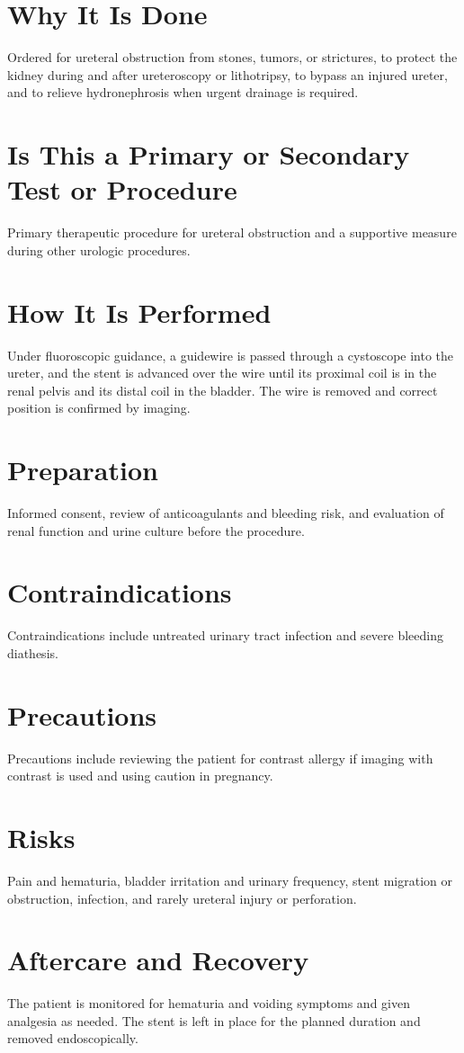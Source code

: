 \section*{Why It Is Done}
Ordered for ureteral obstruction from stones, tumors, or strictures, to protect the kidney during and after ureteroscopy or lithotripsy, to bypass an injured ureter, and to relieve hydronephrosis when urgent drainage is required.
\section*{Is This a Primary or Secondary Test or Procedure}
Primary therapeutic procedure for ureteral obstruction and a supportive measure during other urologic procedures.
\section*{How It Is Performed}
Under fluoroscopic guidance, a guidewire is passed through a cystoscope into the ureter, and the stent is advanced over the wire until its proximal coil is in the renal pelvis and its distal coil in the bladder. The wire is removed and correct position is confirmed by imaging.
\section*{Preparation}
Informed consent, review of anticoagulants and bleeding risk, and evaluation of renal function and urine culture before the procedure.
\section*{Contraindications}
Contraindications include untreated urinary tract infection and severe bleeding diathesis.

\section*{Precautions}
Precautions include reviewing the patient for contrast allergy if imaging with contrast is used and using caution in pregnancy.

\section*{Risks}
Pain and hematuria, bladder irritation and urinary frequency, stent migration or obstruction, infection, and rarely ureteral injury or perforation.

\section*{Aftercare and Recovery}
The patient is monitored for hematuria and voiding symptoms and given analgesia as needed. The stent is left in place for the planned duration and removed endoscopically.

